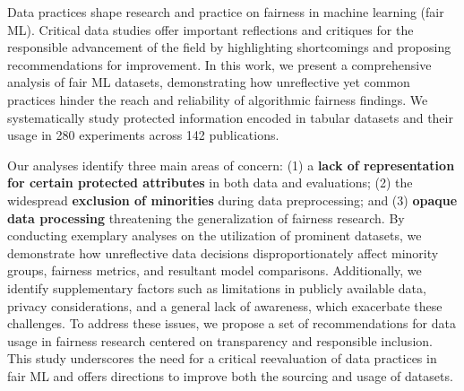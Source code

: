 Data practices shape research and practice on fairness in machine learning (fair ML). Critical data studies offer important reflections and critiques for the responsible advancement of the field by highlighting shortcomings and proposing recommendations for improvement. In this work, we present a comprehensive analysis of fair ML datasets, demonstrating how unreflective yet common practices hinder the reach and reliability of algorithmic fairness findings. We systematically study protected information encoded in tabular datasets and their usage in 280 experiments across 142 publications.
  
  Our analyses identify three main areas of concern: (1) a \textbf{lack of representation for certain protected attributes} in both data and evaluations; (2) the widespread \textbf{exclusion of minorities} during data preprocessing; and (3) \textbf{opaque data processing} threatening the generalization of fairness research. By conducting exemplary analyses on the utilization of prominent datasets, we demonstrate how unreflective data decisions disproportionately affect minority groups, fairness metrics, and resultant model comparisons.  Additionally, we identify supplementary factors such as limitations in publicly available data, privacy considerations, and a general lack of awareness, which exacerbate these challenges. To address these issues, we propose a set of recommendations for data usage in fairness research centered on transparency and responsible inclusion. This study underscores the need for a critical reevaluation of data practices in fair ML and offers directions to improve both the sourcing and usage of datasets.